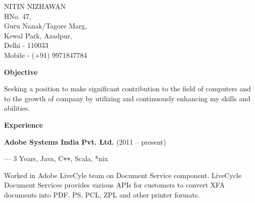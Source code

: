 \documentclass{article}
\begin{document}
  \begin{flushright}
{\LARGE NITIN NIZHAWAN}\\[11pt]
HNo. 47,\\
Guru Nanak/Tagore Marg,\\
Kewal Park, Azadpur,\\
Delhi - 110033\\
Mobile - (+91) 9971847784
  \end{flushright}
\hrulefill

\begin{flushleft} {\large\bf Objective}
\end{flushleft}

Seeking a position to make significant contribution to the field of computers and to the growth of company by utilizing and continuously enhancing my skills and abilities.
\begin{flushleft}
\large\bf{Experience}
\end{flushleft}

\begin{center}
   {\bf Adobe Systems India Pvt. Ltd.} (2011 -- present)\\
\end{center}
\begin{flushright} --- 3{\thinspace\tiny\raisebox{0.5em}{1}\raisebox{0.25em}{/}\raisebox{-0.1em}{2}} Years, Java, C{}\verb!++!, Scala, *nix \end{flushright}
   Worked in Adobe LiveCyle team on Document Service component. LiveCycle Document Services provides various APIs for customers to convert XFA documents into PDF, PS, PCL, ZPL and other printer formats.\\
   
\end{document}
